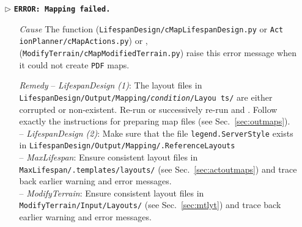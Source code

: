 \begin{itemize}
	\item[$\triangleright$]\textbf{\texttt{ERROR: Mapping failed.}}
	\begin{itemize}
		\item[\textit{Cause}\hspace{0.27cm}] The function  (\texttt{LifespanDesign/cMapLifespanDesign.py} or \texttt{Act ionPlanner/cMapActions.py}) or , \\
	 (\texttt{ModifyTerrain/cMapModifiedTerrain.py}) raise this error message when it could not create \texttt{PDF} maps. 
		\item[\textit{Remedy}] -- \textit{LifespanDesign (1)}: The layout files in \texttt{LifespanDesign/Output/Mapping/\textit{condition}/Layou ts/} are either corrupted or non-existent. Re-run  or successively re-run  and . Follow exactly the instructions for preparing map files (see Sec.~\ref{sec:outmaps}).\\
		 -- \textit{LifespanDesign (2)}: Make sure that the file \texttt{legend.ServerStyle} exists in \texttt{LifespanDesign/Output/Mapping/.ReferenceLayouts}\\
		 -- \textit{MaxLifespan}: Ensure consistent layout files in \texttt{MaxLifespan/.templates/layouts/} (see Sec.~\ref{sec:actoutmaps}) and trace back earlier warning and error messages.\\
		 -- \textit{ModifyTerrain}: Ensure consistent layout files in \texttt{ModifyTerrain/Input/Layouts/} (see Sec.~\ref{sec:mtlyt}) and trace back earlier warning and error messages.\\
	\end{itemize}
	

\end{itemize}
